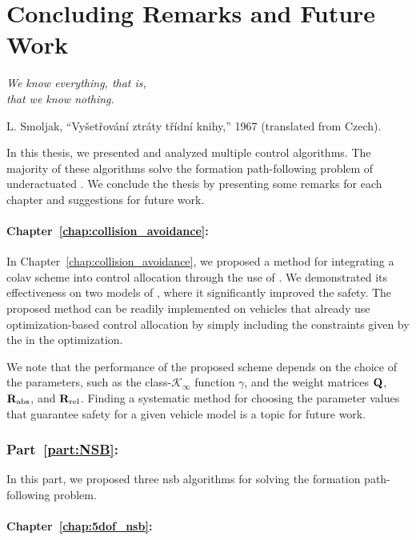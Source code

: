 \chapter{Concluding Remarks and Future Work}
\label{part:conclusions}

\setlength{\epigraphwidth}{0.46\textwidth}
\epigraph{ \it
    We know everything, that is, \\
    that we know nothing.
}{
    L. Smoljak, ``Vyšetřování ztráty třídní knihy,'' 1967 (translated from Czech).
}

In this thesis, we presented and analyzed multiple control algorithms.
The majority of these algorithms solve the formation path-following problem of underactuated .
We conclude the thesis by presenting some remarks for each chapter and suggestions for future work.

\subsubsection{Chapter~\ref{chap:collision_avoidance}: }
In Chapter~\ref{chap:collision_avoidance}, we proposed a method for integrating a \acrfull{colav} scheme into control allocation through the use of .
We demonstrated its effectiveness on two models of , where it significantly improved the safety.
The proposed method can be readily implemented on vehicles that already use optimization-based control allocation by simply including the constraints given by the  in the optimization.

We note that the performance of the proposed scheme depends on the choice of the parameters, such as the class-$\mathcal{K}_{\infty}$ function $\gamma$, and the weight matrices $\mathbf{Q}$, $\mathbf{R}_{\rm abs}$, and $\mathbf{R}_{\rm rel}$.
Finding a systematic method for choosing the parameter values that guarantee safety for a given vehicle model is a topic for future work.

\subsection*{Part~\ref{part:NSB}: }

In this part, we proposed three \gls{nsb} algorithms for solving the formation path-following problem.

\subsubsection{Chapter~\ref{chap:5dof_nsb}: }

